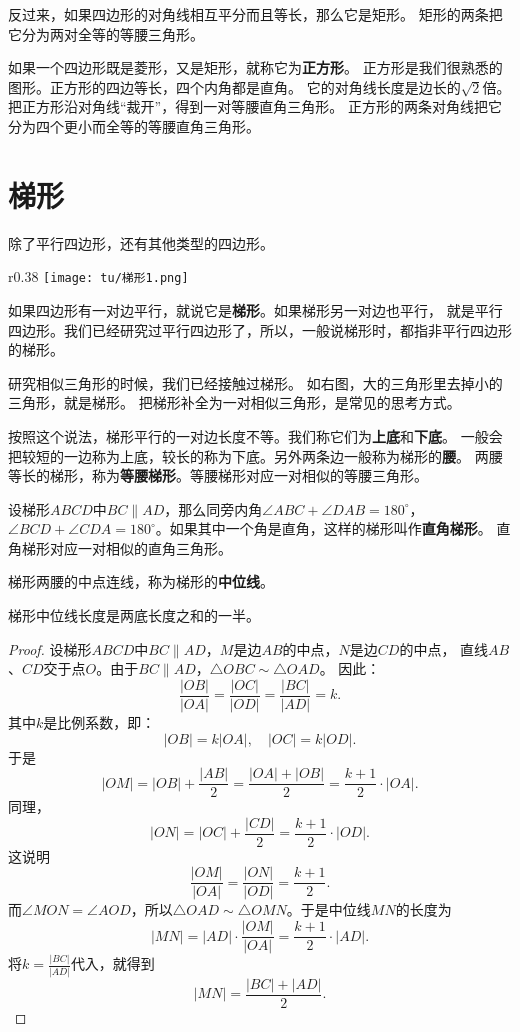 \documentclass[12pt,UTF8]{ctexbook}
\begin{document}
反过来，如果四边形的对角线相互平分而且等长，那么它是矩形。
矩形的两条把它分为两对全等的等腰三角形。

如果一个四边形既是菱形，又是矩形，就称它为\textbf{正方形}。
正方形是我们很熟悉的图形。正方形的四边等长，四个内角都是直角。
它的对角线长度是边长的$\sqrt{2}$倍。把正方形沿对角线“裁开”，得到一对等腰直角三角形。
正方形的两条对角线把它分为四个更小而全等的等腰直角三角形。

\section{梯形}
除了平行四边形，还有其他类型的四边形。

\begin{wrapfigure}[8]{r}{0.38\textwidth} %
    \vspace{-35pt}
    \centering
    \texttt{[image: tu/梯形1.png]}
\end{wrapfigure}

如果四边形有一对边平行，就说它是\textbf{梯形}。如果梯形另一对边也平行，
就是平行四边形。我们已经研究过平行四边形了，所以，一般说梯形时，都指非平行四边形的梯形。

研究相似三角形的时候，我们已经接触过梯形。
如右图，大的三角形里去掉小的三角形，就是梯形。
把梯形补全为一对相似三角形，是常见的思考方式。

按照这个说法，梯形平行的一对边长度不等。我们称它们为\textbf{上底}和\textbf{下底}。
一般会把较短的一边称为上底，较长的称为下底。另外两条边一般称为梯形的\textbf{腰}。
两腰等长的梯形，称为\textbf{等腰梯形}。等腰梯形对应一对相似的等腰三角形。

设梯形$ABCD$中$BC \parallel AD$，那么同旁内角$\angle ABC + \angle DAB = 180^\circ$，
$\angle BCD + \angle CDA = 180^\circ$。如果其中一个角是直角，这样的梯形叫作\textbf{直角梯形}。
直角梯形对应一对相似的直角三角形。

梯形两腰的中点连线，称为梯形的\textbf{中位线}。
\begin{tm}\label{tm:0-2-20}
    梯形中位线长度是两底长度之和的一半。
\end{tm}
\begin{proof}
    设梯形$ABCD$中$BC \parallel AD$，$M$是边$AB$的中点，$N$是边$CD$的中点，
    直线$AB$、$CD$交于点$O$。由于$BC \parallel AD$，$\triangle OBC \sim \triangle OAD$。
    因此：
    $$ \frac{|OB|}{|OA|} = \frac{|OC|}{|OD|} = \frac{|BC|}{|AD|} = k.$$
    其中$k$是比例系数，即：
    $$ |OB| = k|OA|, \quad |OC| = k|OD|.$$
    于是
    $$ |OM| = |OB| + \frac{|AB|}{2} = \frac{|OA| + |OB|}{2} = \frac{k+1}{2} \cdot|OA|.$$
    同理，
    $$ |ON| = |OC| + \frac{|CD|}{2} = \frac{k+1}{2}\cdot|OD|. $$
    这说明
    $$ \frac{|OM|}{|OA|} = \frac{|ON|}{|OD|} = \frac{k+1}{2}. $$
    而$\angle MON = \angle AOD$，所以$\triangle OAD \sim \triangle OMN$。于是中位线$MN$的长度为
    $$ |MN| = |AD| \cdot \frac{|OM|}{|OA|} = \frac{k+1}{2}\cdot|AD|. $$
    将$k = \frac{|BC|}{|AD|}$代入，就得到
    $$ |MN| = \frac{|BC| + |AD|}{2}. $$
\end{proof}
\end{document}
